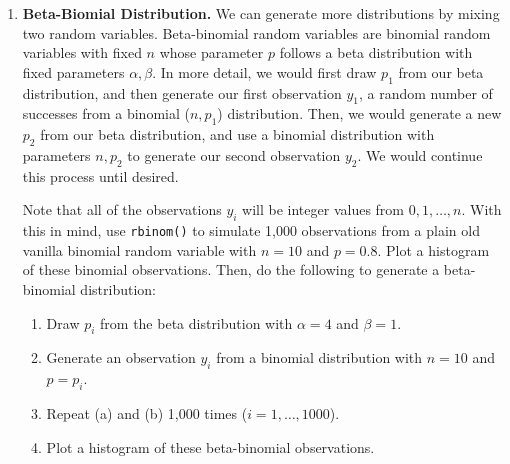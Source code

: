\documentclass[
]{krantz}
\providecommand{\tightlist}{%
  \setlength{\itemsep}{0pt}\setlength{\parskip}{0pt}}
\begin{document}
\begin{enumerate}
\def\labelenumi{\arabic{enumi}.}
\item
  \textbf{Beta-Biomial Distribution.} We can generate more distributions by mixing two random variables.  Beta-binomial random variables are binomial random variables with fixed \(n\) whose parameter \(p\) follows a beta distribution with fixed parameters \(\alpha, \beta\). In more detail, we would first draw \(p_1\) from our beta distribution, and then generate our first observation \(y_1\), a random number of successes from a binomial (\(n, p_1\)) distribution. Then, we would generate a new \(p_2\) from our beta distribution, and use a binomial distribution with parameters \(n, p_2\) to generate our second observation \(y_2\). We would continue this process until desired.

  Note that all of the observations \(y_i\) will be integer values from \(0, 1, \ldots, n\). With this in mind, use \texttt{rbinom()} to simulate 1,000 observations from a plain old vanilla binomial random variable with \(n=10\) and \(p=0.8\). Plot a histogram of these binomial observations. Then, do the following to generate a beta-binomial distribution:

  \begin{enumerate}
  \def\labelenumii{\alph{enumii}.}
  \tightlist
  \item
    Draw \(p_i\) from the beta distribution with \(\alpha=4\) and \(\beta=1\).
  \item
    Generate an observation \(y_i\) from a binomial distribution with \(n=10\) and \(p = p_i\).
  \item
    Repeat (a) and (b) 1,000 times (\(i=1,\ldots,1000\)).
  \item
    Plot a histogram of these beta-binomial observations.
  \end{enumerate}


\end{enumerate}
\end{document}
